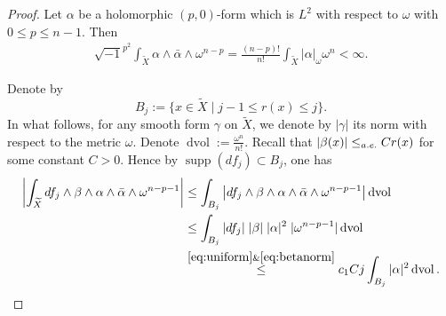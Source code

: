 \documentclass[11pt,a4paper,english]{smfart}
\theoremstyle{plain}
\theoremstyle{definition}
\theoremstyle{plain}
\DeclareMathOperator{\dvol}{dvol}
\begin{document}
\begin{proof}
		
	  Let $\alpha$ be a  holomorphic $(p,0)$-form which is $L^2$ with respect to $\omega$ with $0\leq p\leq n-1$. Then 
	\begin{align}\label{eq:finite}
 \sqrt{-1}^{p^2}\int_{\widetilde{X}}\alpha\wedge \bar{\alpha}\wedge \omega^{n-p}	=	\frac{(n-p)!}{n!}\int_{\widetilde{X}  }    |\alpha|_{\omega}\omega^n <\infty.
		\end{align}
	
	
	 
		Denote by 
		$$
		B_j:=\{x\in \widetilde{X}\mid   j-1\leq r(x)\leq  j \}.
		$$  
	In what follows, 	for any smooth form $\gamma$ on $\widetilde{X}$, we denote by $|\gamma|$ its norm with respect to the metric $\omega$.  	Denote $\dvol:=\frac{\omega^n}{n!}$.    
Recall that  $|\beta(x)| \leq_{\rm a.e.} Cr(x)$ for some constant $C>0$. Hence by $\operatorname{supp}( df_j) \subset {B_{j}} $,  one has
		\begin{align} \nonumber
			\left|  \int_{\widetilde{X} }  df_j\wedge \beta\wedge\alpha\wedge \bar{\alpha}\wedge \omega^{n-p-1}  \right| 
			&\leq   \int_{  B_j} \left|  df_j\wedge \beta\wedge\alpha\wedge \bar{\alpha}\wedge \omega^{n-p-1}\right| \dvol   \\ \nonumber
			&\leq \int_{B_j}     |d f_j| \;  |\beta| \; | {\alpha}|^2 \; |\omega^{n-p-1}|   \dvol\\\label{eq:small}
			&\stackrel{\eqref{eq:uniform}\& \eqref{eq:betanorm} }{\leq} c_1Cj\int_{B_j}     | {\alpha}|^2   \dvol.  
		\end{align}
		

\end{proof}
\end{document}
